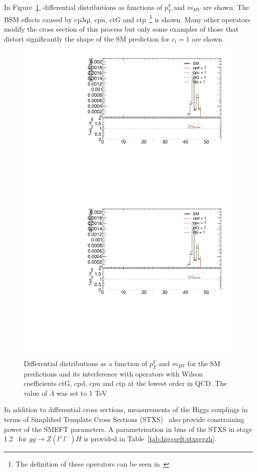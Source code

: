 In Figure~\ref{fig:higgseft:ggzh}, differential distributions as functions of $p_{T}^{V}$ and $m_{HV}$ are shown. The BSM effects caused by cp3qi, cpu, ctG and ctp~\footnote{The definition of these operators can be seen in~\cite{SMEFTNLOdefs}} is shown.  Many other operators modify the cross section of this process but only some examples of those that distort significantly the shape of the SM prediction for  $c_i=1$ are shown.

\begin{figure}
\includegraphics[width=0.49\linewidth,page=7]{figures/kinematics_ggHll_np0.pdf}
\includegraphics[width=0.49\linewidth,page=10]{figures/kinematics_ggHll_np0.pdf}
\label{fig:higgseft:ggzh}
\caption{Differential distributions as a function of $p_{T}^{V}$ and $m_{HV}$ for the SM predictions and its interference with operators with Wilson coefficients ctG, cpd, cpu and ctp  at the lowest order in QCD. The value of $\Lambda$ was set to 1 TeV}  
\end{figure}

In addition to differential cross sections, measurements  of the Higgs couplings in terms of Simplified Template Cross Sections (STXS)~\cite{deFlorian:2016spz} also provide constraining power of the SMEFT parameters. A parametrisation in bins of the STXS in stage 1.2~\cite{Berger:2019wnu}  for $gg\to Z(l^{+}l^{-})H$  is provided in Table~\ref{tab:higgseft:stxsggzh}.

